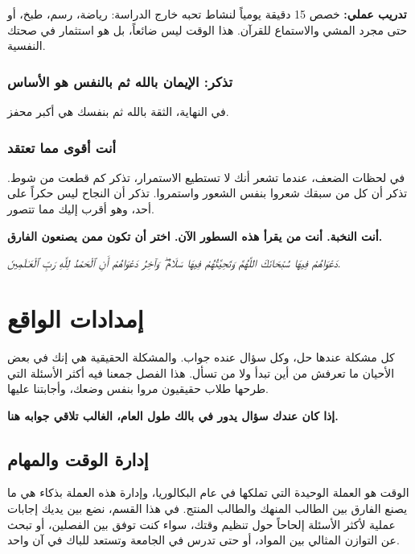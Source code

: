 \documentclass[12pt,a4paper]{book}
\newcommand{\quoteAr}[1]{%
	\begin{myquote}
		\itshape #1
	\end{myquote}
}
\newcommand{\importantAr}[1]{%
	\begin{important}
		\bfseries #1
	\end{important}
}
\newcommand{\exerciseAr}[1]{%
	\begin{exercise}
		\textbf{تدريب عملي:} #1
	\end{exercise}
}
\begin{document}
	\exerciseAr{
		خصص 15 دقيقة يومياً لنشاط تحبه خارج الدراسة: رياضة، رسم، طبخ، أو حتى مجرد المشي والاستماع للقرآن. هذا الوقت ليس ضائعاً، بل هو استثمار في صحتك النفسية.
	}
	
	\subsection{تذكر: الإيمان بالله ثم بالنفس هو الأساس}
	في النهاية، الثقة بالله ثم بنفسك هي أكبر محفز.
	
	\subsection{ أنت أقوى مما تعتقد}
	
	في لحظات الضعف، عندما تشعر أنك لا تستطيع الاستمرار، تذكر كم قطعت من شوط. تذكر أن كل من سبقك شعروا بنفس الشعور واستمروا. تذكر أن النجاح ليس حكراً على أحد، وهو أقرب إليك مما تتصور.
	
	\importantAr{أنت النخبة. أنت من يقرأ هذه السطور الآن. اختر أن تكون ممن يصنعون الفارق.}
	
	\quoteAr{دَعْوَاهُمْ فِيهَا سُبْحَانَكَ اللَّهُمَّ وَتَحِيَّتُهُمْ فِيهَا سَلَامٌ ۖ وَآخِرُ دَعْوَاهُمْ أَنِ ٱلْحَمْدُ لِلَّهِ رَبِّ ٱلْعَـٰلَمِينَ.}
	
	
	
	
	
	\chapter{إمدادات الواقع}
	\label{chap:questions}
	
	كل مشكلة عندها حل، وكل سؤال عنده جواب. والمشكلة الحقيقية هي إنك في بعض الأحيان ما تعرفش من أين تبدأ ولا من تسأل. هذا الفصل جمعنا فيه أكثر الأسئلة التي طرحها طلاب حقيقيون مروا بنفس وضعك، وأجابتنا عليها.
	
	\importantAr{إذا كان عندك سؤال يدور في بالك طول العام، الغالب تلاقي جوابه هنا.}
	
	
	\section{إدارة الوقت والمهام}
	
	الوقت هو العملة الوحيدة التي تملكها في عام البكالوريا، وإدارة هذه العملة بذكاء هي ما يصنع الفارق بين الطالب المنهك والطالب المنتج. في هذا القسم، نضع بين يديك إجابات عملية لأكثر الأسئلة إلحاحاً حول تنظيم وقتك، سواء كنت توفق بين الفصلين، أو تبحث عن التوازن المثالي بين المواد، أو حتى تدرس في الجامعة وتستعد للباك في آن واحد.
	
\end{document}
